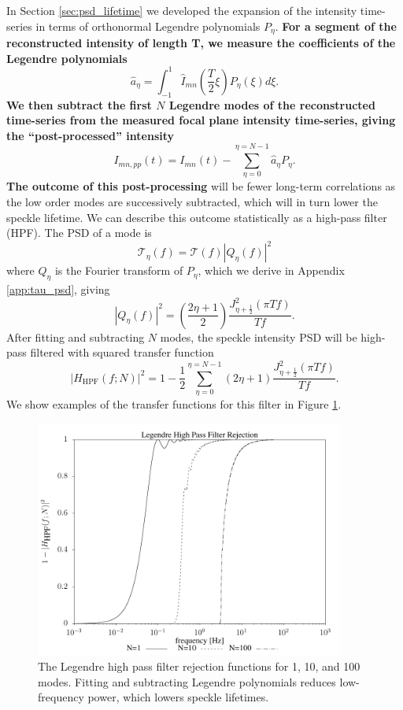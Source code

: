 \documentclass[10pt,preprint]{aastex631}
\begin{document}
In Section \ref{sec:psd_lifetime} we developed the expansion of the intensity time-series in terms of orthonormal Legendre polynomials $P_\eta$.  \textbf{For a segment of the reconstructed intensity of length T, we measure the coefficients of the Legendre polynomials}
\begin{equation}
\hat{a}_\eta = \int_{-1}^1 \hat{I}_{mn}(\frac{T}{2}\xi) P_\eta(\xi) d\xi. 
\end{equation}
\textbf{We then subtract the first $N$ Legendre modes of the reconstructed time-series from the measured focal plane intensity time-series, giving the ``post-processed'' intensity} 
\begin{equation}
I_{mn,pp}(t) = I_{mn}(t) - \sum_{\eta=0}^{\eta=N-1} \hat{a}_\eta P_\eta. 
\end{equation}
\textbf{The outcome of this post-processing} will be fewer long-term correlations as the low order modes are successively subtracted, which will in turn lower the speckle lifetime.  We can describe this outcome statistically as a high-pass filter (HPF).  The PSD of a mode is
\begin{equation}
\mathcal{T}_\eta(f) = \mathcal{T}(f) \left|Q_\eta(f)\right|^2
\end{equation}
where ${Q}_\eta$ is the Fourier transform of $P_\eta$, which we derive in Appendix \ref{app:tau_psd}, giving
\begin{equation}
 \left|Q_\eta(f)\right|^2 = \left(\frac{2\eta+1}{2}\right)\frac{J_{\eta+\frac{1}{2}}^2(\pi T f)}{T f}.
\end{equation}
After fitting and subtracting $N$ modes, the speckle intensity PSD will be high-pass filtered with squared transfer function
\begin{equation}
\left| H_\mathrm{HPF}(f;N) \right| ^2 = 1 - \frac{1}{2}\sum_{\eta=0}^{\eta=N-1} (2\eta+1) \frac{J_{\eta+\frac{1}{2}}^2(\pi T f)}{T f}.
\end{equation}
We show examples of the transfer functions for this filter in Figure \ref{fig:leghpf}.  

\begin{figure}
\centering
\includegraphics[width=4in]{hpf.pdf}
\caption{The Legendre high pass filter rejection functions for 1, 10, and 100 modes. Fitting and subtracting Legendre polynomials reduces low-frequency power, which lowers speckle lifetimes.\label{fig:leghpf}}
\end{figure}
\end{document}
